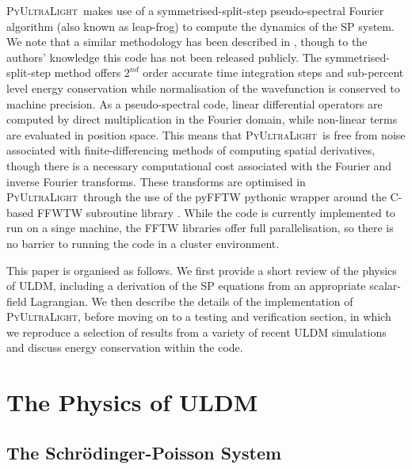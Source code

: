 \documentclass[a4paper,11pt]{article}
\newcommand{\PyUltraLight}{\textsc{PyUltraLight}\xspace}
\begin{document}
\PyUltraLight\ makes use of a symmetrised-split-step pseudo-spectral Fourier algorithm (also known as leap-frog) to compute the dynamics of the SP system. We note that a similar methodology has been described in \cite{Paredes2016}, though to the authors' knowledge this code has not been released publicly. The symmetrised-split-step method offers $2^{nd}$ order accurate time integration steps and sub-percent level energy conservation while normalisation of the wavefunction is conserved to machine precision. As a pseudo-spectral code, linear differential operators are computed by direct multiplication in the Fourier domain, while non-linear terms are evaluated in position space. This means that \PyUltraLight\ is free from noise associated with finite-differencing methods of computing spatial derivatives, though there is a necessary computational cost associated with the Fourier and inverse Fourier transforms. These transforms are optimised in \PyUltraLight\ through the use of the pyFFTW pythonic wrapper around the C-based FFWTW subroutine library \cite{pyfftw} \cite{fftw}. While the code is currently implemented to run on a singe machine, the FFTW libraries offer full parallelisation, so there is no barrier to running the code in a cluster environment.  

This paper is organised as follows. We first provide a short review of the physics of ULDM, including a derivation of the SP equations from an appropriate scalar-field Lagrangian. We then describe the details of the implementation of \PyUltraLight, before moving on to a testing and verification section, in which we reproduce a selection of results from a variety of recent ULDM simulations and discuss energy conservation within the code. 


\section{The Physics of ULDM}\label{sec:physics}

\subsection{The Schr{\"o}dinger-Poisson System}
\end{document}
